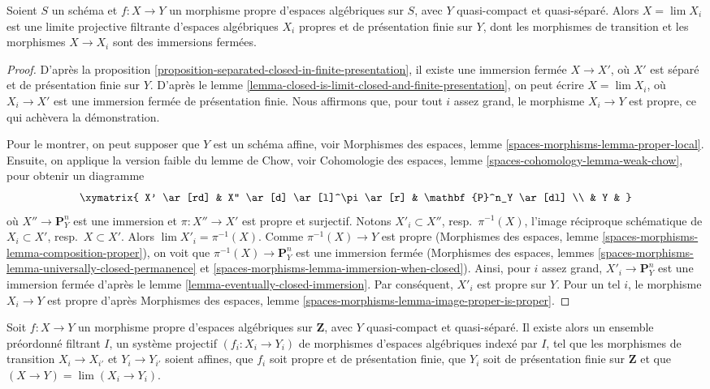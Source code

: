 \begin{lemma}
\label{lemma-proper-limit-of-proper-finite-presentation}
Soient $S$ un schéma et $f : X \to Y$ un morphisme propre d'espaces
algébriques sur $S$, avec $Y$ quasi-compact et quasi-séparé. Alors
$X = \lim X_i$ est une limite projective filtrante d'espaces algébriques $X_i$
propres et de présentation finie sur $Y$, dont les morphismes de transition
et les morphismes $X \to X_i$ sont des immersions fermées.
\end{lemma}

\begin{proof}
D'après la proposition \ref{proposition-separated-closed-in-finite-presentation},
il existe une immersion fermée $X \to X'$, où $X'$ est séparé et de
présentation finie sur $Y$. D'après le
lemme \ref{lemma-closed-is-limit-closed-and-finite-presentation},
on peut écrire $X = \lim X_i$, où $X_i \to X'$ est une immersion fermée de
présentation finie. Nous affirmons que, pour tout $i$ assez grand,
le morphisme $X_i \to Y$ est propre, ce qui achèvera la démonstration.

\medskip\noindent
Pour le montrer, on peut supposer que $Y$ est un schéma affine, voir
Morphismes des espaces, lemme \ref{spaces-morphisms-lemma-proper-local}.
Ensuite, on applique la version faible du lemme de Chow, voir
Cohomologie des espaces, lemme \ref{spaces-cohomology-lemma-weak-chow},
pour obtenir un diagramme
$$
\xymatrix{
X' \ar[rd] & X'' \ar[d] \ar[l]^\pi \ar[r] & \mathbf{P}^n_Y \ar[dl] \\
& Y &
}
$$
où $X'' \to \mathbf{P}^n_Y$ est une immersion et
$\pi : X'' \to X'$ est propre et surjectif. Notons
$X'_i \subset X''$, resp.\ $\pi^{-1}(X)$, l'image réciproque schématique de
$X_i \subset X'$, resp.\ $X \subset X'$.
Alors $\lim X'_i = \pi^{-1}(X)$. Comme $\pi^{-1}(X) \to Y$ est propre
(Morphismes des espaces, lemme \ref{spaces-morphisms-lemma-composition-proper}),
on voit que $\pi^{-1}(X) \to \mathbf{P}^n_Y$ est une immersion fermée
(Morphismes des espaces, lemmes
\ref{spaces-morphisms-lemma-universally-closed-permanence} et
\ref{spaces-morphisms-lemma-immersion-when-closed}).
Ainsi, pour $i$ assez grand,
$X'_i \to \mathbf{P}^n_Y$ est une immersion fermée d'après le
lemme \ref{lemma-eventually-closed-immersion}.
Par conséquent, $X'_i$ est propre sur $Y$.
Pour un tel $i$, le morphisme $X_i \to Y$ est propre d'après
Morphismes des espaces, lemme \ref{spaces-morphisms-lemma-image-proper-is-proper}.
\end{proof}

\begin{lemma}
\label{lemma-proper-limit-of-proper-finite-presentation-noetherian}
Soit $f : X \to Y$ un morphisme propre d'espaces algébriques sur $\mathbf{Z}$,
avec $Y$ quasi-compact et quasi-séparé. Il existe alors un ensemble préordonné
filtrant $I$, un système projectif $(f_i : X_i \to Y_i)$ de morphismes d'espaces
algébriques indexé par $I$, tel que les morphismes de transition $X_i \to X_{i'}$
et $Y_i \to Y_{i'}$ soient affines, que $f_i$ soit propre et de
présentation finie, que $Y_i$ soit de présentation finie sur
$\mathbf{Z}$ et que $(X \to Y) = \lim (X_i \to Y_i)$.
\end{lemma}

